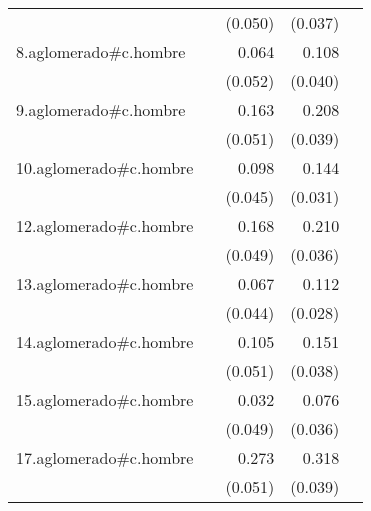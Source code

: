 {\begin{longtable}{l*{4}{D{.}{.}{-1}}}
            &                     &     (0.050)         &     (0.037)         &                     \\
\addlinespace
8.aglomerado#c.hombre&                     &       0.064         &       0.108\sym{**} &                     \\
            &                     &     (0.052)         &     (0.040)         &                     \\
\addlinespace
9.aglomerado#c.hombre&                     &       0.163\sym{**} &       0.208\sym{***}&                     \\
            &                     &     (0.051)         &     (0.039)         &                     \\
\addlinespace
10.aglomerado#c.hombre&                     &       0.098\sym{*}  &       0.144\sym{***}&                     \\
            &                     &     (0.045)         &     (0.031)         &                     \\
\addlinespace
12.aglomerado#c.hombre&                     &       0.168\sym{***}&       0.210\sym{***}&                     \\
            &                     &     (0.049)         &     (0.036)         &                     \\
\addlinespace
13.aglomerado#c.hombre&                     &       0.067         &       0.112\sym{***}&                     \\
            &                     &     (0.044)         &     (0.028)         &                     \\
\addlinespace
14.aglomerado#c.hombre&                     &       0.105\sym{*}  &       0.151\sym{***}&                     \\
            &                     &     (0.051)         &     (0.038)         &                     \\
\addlinespace
15.aglomerado#c.hombre&                     &       0.032         &       0.076\sym{*}  &                     \\
            &                     &     (0.049)         &     (0.036)         &                     \\
\addlinespace
17.aglomerado#c.hombre&                     &       0.273\sym{***}&       0.318\sym{***}&                     \\
            &                     &     (0.051)         &     (0.039)         &                     \\

\end{longtable}}
